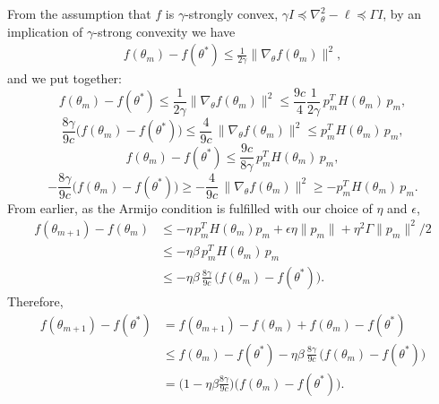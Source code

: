 From the assumption that $f$ is $\gamma$-strongly convex, $\gamma I \preceq \nabla_\theta^2 -\ell \preceq \Gamma I$, by an implication of $\gamma$-strong convexity we have
\begin{align}
    f(\theta_m) - f(\theta^*) \leq \frac{1}{2\gamma}\big\|\nabla_\theta f(\theta_m)\big\|^2,
\end{align}
and we put together:
\begin{equation}
    f(\theta_m) - f(\theta^*) \leq \frac{1}{2\gamma}\big\|\nabla_\theta f(\theta_m)\big\|^2 \leq \frac{9c}{4}\frac{1}{2\gamma}\, p_m^TH(\theta_m)\, p_m,
\end{equation}
\begin{equation}
    \frac{8\gamma}{9c}\big(f(\theta_m) - f(\theta^*)\big) \leq \frac{4}{9c}\, \big\|\nabla_\theta f(\theta_m)\big\|^2 \leq p_m^TH(\theta_m)\, p_m,
\end{equation}
\begin{equation}
    f(\theta_m) - f(\theta^*) \leq \frac{9c}{8\gamma}\, p_m^TH(\theta_m)\, p_m,
\end{equation}
\begin{equation}
    -\frac{8\gamma}{9c}\big(f(\theta_m) - f(\theta^*)\big) \geq -\frac{4}{9c}\, \big\|\nabla_\theta f(\theta_m)\big\|^2 \geq -p_m^TH(\theta_m)\, p_m.
\end{equation}
From earlier, as the Armijo condition is fulfilled with our choice of $\eta$ and $\epsilon$,
\begin{align}
    f(\theta_{m+1})-f(\theta_m) &\leq -\eta \, p_m^TH(\theta_m)p_m + \epsilon\eta\|p_m\| + \eta^2 \Gamma \|p_m\|^2 / 2 \\
    &\leq -\eta\beta \,  p_m^TH(\theta_m)\, p_m \\
    &\leq -\eta\beta \, \frac{8\gamma}{9c}\, \big(f(\theta_m) - f(\theta^*)\big).
\end{align}
Therefore,
\begin{align}
    f(\theta_{m+1}) - f(\theta^*) 
    &= f(\theta_{m+1})-f(\theta_m)+f(\theta_m)- f(\theta^*) \\
    &\leq f(\theta_m)- f(\theta^*) -\eta\beta\, \frac{8\gamma}{9c} \, \big(f(\theta_m) - f(\theta^*)\big) \\
    &= \Big(1-\eta\beta\frac{8\gamma}{9c}\Big)\big(f(\theta_m) - f(\theta^*)\big).
\end{align}

